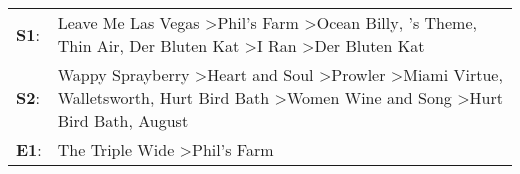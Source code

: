 \begin{supertabular}{p{0.03\textwidth}p{0.92\textwidth}}
 \textbf{S1}:  &                                                                  Leave Me Las Vegas\textsuperscript{} \textgreater \enspace Phil's Farm\textsuperscript{} \textgreater \enspace Ocean Billy\textsuperscript{}, 's Theme\textsuperscript{}, \enspace Thin Air\textsuperscript{}, \enspace Der Bluten Kat\textsuperscript{} \textgreater \enspace I Ran\textsuperscript{} \textgreater \enspace Der Bluten Kat\textsuperscript{}  \enspace  \\
 \textbf{S2}:  &  Wappy Sprayberry\textsuperscript{} \textgreater \enspace Heart and Soul\textsuperscript{} \textgreater \enspace Prowler\textsuperscript{} \textgreater \enspace Miami Virtue\textsuperscript{}, \enspace Walletsworth\textsuperscript{}, \enspace Hurt Bird Bath\textsuperscript{} \textgreater \enspace Women Wine and Song\textsuperscript{} \textgreater \enspace Hurt Bird Bath\textsuperscript{}, \enspace August\textsuperscript{}  \enspace  \\
 \textbf{E1}:  &                                                                                                                                                                                                                                                                                                                                                     The Triple Wide\textsuperscript{} \textgreater \enspace Phil's Farm\textsuperscript{}  \enspace  \\
\end{supertabular}
